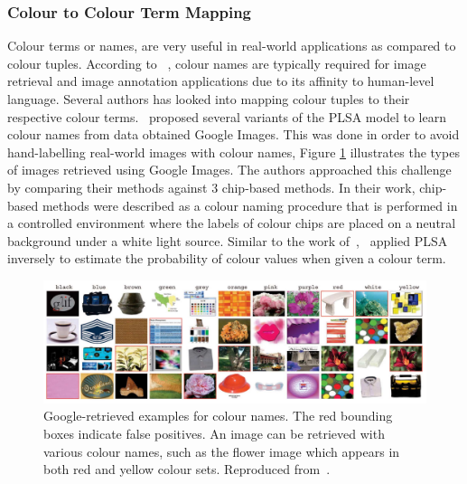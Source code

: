 \vspace{1em}
\subsubsection{Colour to Colour Term Mapping}
\label{sec:color2colorterm}

Colour terms or names, are very useful in real-world applications as compared to colour tuples. According to ~\cite{van2009learning}, colour names are typically required for image retrieval and image annotation applications due to its affinity to human-level language. Several authors has looked into mapping colour tuples to their respective colour terms.~ proposed several variants of the PLSA model to learn colour names from data obtained Google Images. This was done in order to avoid hand-labelling real-world images with colour names, Figure \ref{fig:van20091} illustrates the types of images retrieved using Google Images. The authors approached this challenge by comparing their methods against 3 chip-based methods. In their work, chip-based methods were described as a colour naming procedure that is performed in a controlled environment where the labels of colour chips are placed on a neutral background under a white light source. Similar to the work of~,~ applied PLSA inversely to estimate the probability of colour values when given a colour term.

\begin{figure}[hbt!]
 \centering
 \includegraphics[width=1\textwidth]{image/lit/van20091.PNG}
 \caption[Google-retrieved examples for colour names. The red bounding boxes
 indicate false positives. An image can be retrieved with various colour names,
 such as the flower image which appears in the red and the yellow
 set]{Google-retrieved examples for colour names. The red bounding boxes
 indicate false positives. An image can be retrieved with various colour names,
 such as the flower image which appears in both red and yellow colour sets.
 Reproduced from~.}
 \label{fig:van20091}
\end{figure}

